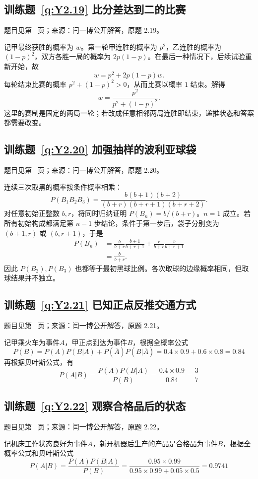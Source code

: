 \documentclass[UTF8,12pt,a4paper,fontset=fandol]{ctexbook}
\begin{document}
\subsection*{训练题~\ref{q:Y2.19} 比分差达到二的比赛}\label{a:Y2.19}{\small 题目见第~\pageref{q:Y2.19} 页；来源：闫一博公开解答，原题 2.19。}
\begin{solve}记甲最终获胜的概率为 $w$。第一轮甲连胜的概率为 $p^2$，乙连胜的概率为 $(1-p)^2$，双方各胜一局的概率为 $2p(1-p)$。在最后一种情况下，后续试验重新开始，故\[w=p^2+2p(1-p)w.\]每轮结束比赛的概率 $p^2+(1-p)^2>0$，从而比赛以概率 $1$ 结束。解得\[w=\frac{p^2}{p^2+(1-p)^2}.\]这里的赛制是固定的两局一轮；若改成任意相邻两局连胜即结束，递推状态和答案都需要改变。\end{solve}

\subsection*{训练题~\ref{q:Y2.20} 加强抽样的波利亚球袋}\label{a:Y2.20}{\small 题目见第~\pageref{q:Y2.20} 页；来源：闫一博公开解答，原题 2.20。}
\begin{solve}连续三次取黑的概率按条件概率相乘：\[P(B_1B_2B_3)=\frac{b(b+1)(b+2)}{(b+r)(b+r+1)(b+r+2)}.\]对任意初始正整数 $b,r$，将同时归纳证明 $P(B_n)=b/(b+r)$。$n=1$ 成立。若所有初始构成都满足第 $n-1$ 步结论，条件于第一步后，袋子分别变为 $(b+1,r)$ 或 $(b,r+1)$，于是\[\begin{aligned}P(B_n)&=\frac{b}{b+r}\frac{b+1}{b+r+1}+\frac{r}{b+r}\frac{b}{b+r+1}\\&=\frac{b}{b+r}.\end{aligned}\]因此 $P(B_2),P(B_3)$ 也都等于最初黑球比例。各次取球的边缘概率相同，但取球结果并不独立。\end{solve}

\subsection*{训练题~\ref{q:Y2.21} 已知正点反推交通方式}\label{a:Y2.21}{\small 题目见第~\pageref{q:Y2.21} 页；来源：闫一博公开解答，原题 2.21。}
\begin{solve}
记甲乘火车为事件$A$，甲正点到达为事件$B$，根据全概率公式
\[P(B) = P(A)P(B|A) + P(\overline A )P(B|\overline A ) = 0.4 \times 0.9 + 0.6 \times 0.8 = 0.84\]
再根据贝叶斯公式，有
\[P(A|B) = \frac{{P(A)P(B|A)}}{{P(B)}} = \frac{{0.4 \times 0.9}}{{0.84}} = \frac{3}{7}\]
\end{solve}

\subsection*{训练题~\ref{q:Y2.22} 观察合格品后的状态}\label{a:Y2.22}{\small 题目见第~\pageref{q:Y2.22} 页；来源：闫一博公开解答，原题 2.22。}
\begin{solve}
记机床工作状态良好为事件$A$，新开机器后生产的产品是合格品为事件$B$，根据全概率公式和贝叶斯公式
\[P(A|B) = \frac{{P(A)P(B|A)}}{{P(B)}} = \frac{{0.95 \times 0.99}}{{0.95 \times 0.99 + 0.05 \times 0.5}} = 0.9741\]
\end{solve}
\end{document}
